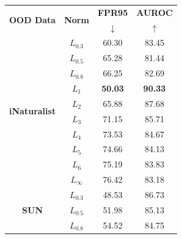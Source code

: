 \documentclass{article}
\begin{document}
\begin{table}[t]
    \centering
\small 
\begin{tabular}{c|c|cc}
\toprule
\multirow{2}{*}{\textbf{OOD Data}}     & \multirow{2}{*}{\textbf{Norm}} & \textbf{FPR95}       & \textbf{AUROC}       \\
                                       &                                & \multicolumn{1}{c}{$\downarrow$} & \multicolumn{1}{c}{$\uparrow$} \\ \midrule
\multirow{10}{*}{\textbf{iNaturalist}} & $L_{0.3}$                           & 60.30                & 83.45                \\
                                       & $L_{0.5}$                           & 65.28                & 81.44                \\
                                       & $L_{0.8}$                           & 66.25                & 82.69                \\
                                       & $L_{1}$                             & \textbf{50.03}       & \textbf{90.33}       \\
                                       & $L_{2}$                             & 65.88                & 87.68                \\
                                       & $L_{3}$                             & 71.15                & 85.71                \\
                                       & $L_{4}$                             & 73.53                & 84.67                \\
                                       & $L_{5}$                             & 74.66                & 84.13                \\
                                       & $L_{6}$                             & 75.19                & 83.83                \\
                                       & $L_{\infty}$                           & 76.42                & 83.18                \\ \midrule
\multirow{10}{*}{\textbf{SUN}}         & $L_{0.3}$                           & 48.53                & 86.73                \\
                                       & $L_{0.5}$                           & 51.98                & 85.13                \\
                                       & $L_{0.8}$                           & 54.52                & 84.75                \\

\end{tabular}
\end{table}
\end{document}
